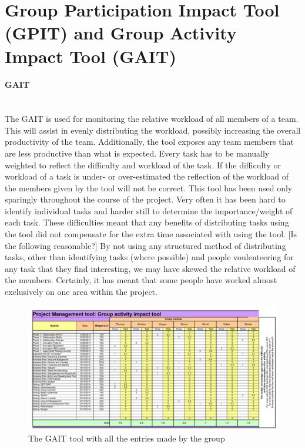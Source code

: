 \section{ \textbf{G}roup \textbf{P}articipation \textbf{I}mpact \textbf{T}ool (GPIT) and \textbf{G}roup \textbf{A}ctivity \textbf{I}mpact \textbf{T}ool (GAIT)}
\paragraph*{GAIT}~\\
The GAIT is used for monitoring the relative workload of all members of a team. This will assist in evenly distributing the workload, possibly increasing the overall productivity of the team. Additionally, the tool exposes any team members that are less productive than what is expected. Every task has to be manually weighted to reflect the difficulty and workload of the task. If the difficulty or workload of a task is under- or over-estimated the reflection of the workload of the members given by the tool will not be correct.
This tool has been used only sparingly throughout the course of the project. Very often it has been hard to identify individual tasks and harder still to determine the importance/weight of each task. These difficulties meant that any benefits of distributing tasks using the tool did not compensate for the extra time associated with using the tool. 
[Is the following reasonable?] By not using any structured method of distributing tasks, other than identifying tasks (where possible) and people voulenteering for any task that they find interesting, we may have skewed the relative workload of the members. Certainly, it has meant that some people have worked almost exclusively on one area within the project.
\begin{landscape}
	\begin{figure}[h!]
		\label{fig:GAIT}
		\includegraphics[scale=1.25]{./graphics/GAIT}
		\caption{The GAIT tool with all the entries made by the group}
	\end{figure}
\end{landscape}
